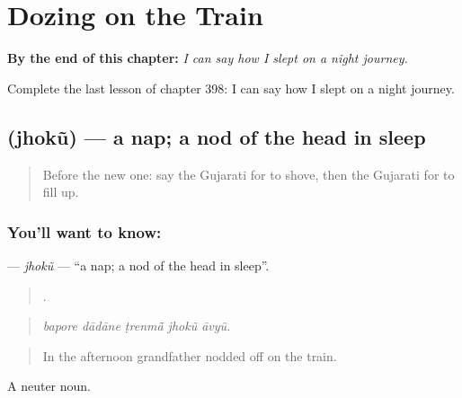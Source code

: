 
\chapter{Dozing on the Train}
\label{ch:gu-dozing-on-the-train}

\begin{chapteropening}
\textbf{By the end of this chapter:} \emph{I can say how I slept on a night journey.}

Complete the last lesson of chapter 398: I can say how I slept on a night journey.
\end{chapteropening}

\section[\texorpdfstring{\gu{ઝોકું} (jhokũ)}{ઝોકું (jhokũ)}]{ (jhokũ) — a nap; a nod of the head in sleep}

\label{lesson:GU-C398-jhoku}



\begin{quote}
Before the new one: say the Gujarati for to shove, then the Gujarati for to fill up.
\end{quote}

\subsection*{You'll want to know: }
\textbf{} — \emph{jhokũ} — \textquotedblleft{}a nap; a nod of the head in sleep\textquotedblright{}.

\begin{quote}
    .
\end{quote}

\begin{quote}
\emph{bapore dādāne ṭrenmā̃ jhokũ āvyũ.}
\end{quote}

\begin{quote}
In the afternoon grandfather nodded off on the train.
\end{quote}

A neuter noun.

